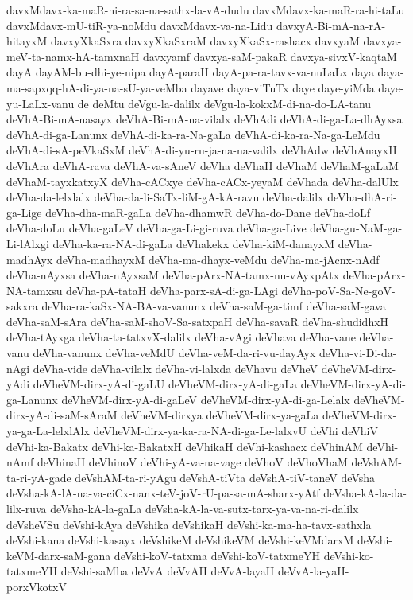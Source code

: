 {davxMdavx-ka-maR-ni-ra-sa-na-sathx-la-vA-dudu
davxMdavx-ka-maR-ra-hi-taLu
davxMdavx-mU-tiR-ya-noMdu
davxMdavx-va-na-Lidu
davxyA-Bi-mA-na-rA-hitayxM
davxyXkaSxra
davxyXkaSxraM
davxyXkaSx-rashacx
davxyaM
davxya-meV-ta-namx-hA-tamxnaH
davxyamf
davxya-saM-pakaR
davxya-sivxV-kaqtaM
dayA
dayAM-bu-dhi-ye-nipa
dayA-paraH
dayA-pa-ra-tavx-va-nuLaLx
daya
daya-ma-sapxqq-hA-di-ya-na-sU-ya-veMba
dayave
daya-viTuTx
daye
daye-yiMda
daye-yu-LaLx-vanu
de
deMtu
deVgu-la-dalilx
deVgu-la-kokxM-di-na-do-LA-tanu
deVhA-Bi-mA-nasayx
deVhA-Bi-mA-na-vilalx
deVhAdi
deVhA-di-ga-La-dhAyxsa
deVhA-di-ga-Lanunx
deVhA-di-ka-ra-Na-gaLa
deVhA-di-ka-ra-Na-ga-LeMdu
deVhA-di-sA-peVkaSxM
deVhA-di-yu-ru-ja-na-na-valilx
deVhAdw
deVhAnayxH
deVhAra
deVhA-rava
deVhA-va-sAneV
deVha
deVhaH
deVhaM
deVhaM-gaLaM
deVhaM-tayxkatxyX
deVha-cACxye
deVha-cACx-yeyaM
deVhada
deVha-dalUlx
deVha-da-lelxlalx
deVha-da-li-SaTx-liM-gA-kA-ravu
deVha-dalilx
deVha-dhA-ri-ga-Lige
deVha-dha-maR-gaLa
deVha-dhamwR
deVha-do-Dane
deVha-doLf
deVha-doLu
deVha-gaLeV
deVha-ga-Li-gi-ruva
deVha-ga-Live
deVha-gu-NaM-ga-Li-lAlxgi
deVha-ka-ra-NA-di-gaLa
deVhakekx
deVha-kiM-danayxM
deVha-madhAyx
deVha-madhayxM
deVha-ma-dhayx-veMdu
deVha-ma-jAcnx-nAdf
deVha-nAyxsa
deVha-nAyxsaM
deVha-pArx-NA-tamx-nu-vAyxpAtx
deVha-pArx-NA-tamxsu
deVha-pA-tataH
deVha-parx-sA-di-ga-LAgi
deVha-poV-Sa-Ne-goV-sakxra
deVha-ra-kaSx-NA-BA-va-vanunx
deVha-saM-ga-timf
deVha-saM-gava
deVha-saM-sAra
deVha-saM-shoV-Sa-satxpaH
deVha-savaR
deVha-shudidhxH
deVha-tAyxga
deVha-ta-tatxvX-dalilx
deVha-vAgi
deVhava
deVha-vane
deVha-vanu
deVha-vanunx
deVha-veMdU
deVha-veM-da-ri-vu-dayAyx
deVha-vi-Di-da-nAgi
deVha-vide
deVha-vilalx
deVha-vi-lalxda
deVhavu
deVheV
deVheVM-dirx-yAdi
deVheVM-dirx-yA-di-gaLU
deVheVM-dirx-yA-di-gaLa
deVheVM-dirx-yA-di-ga-Lanunx
deVheVM-dirx-yA-di-gaLeV
deVheVM-dirx-yA-di-ga-Lelalx
deVheVM-dirx-yA-di-saM-sAraM
deVheVM-dirxya
deVheVM-dirx-ya-gaLa
deVheVM-dirx-ya-ga-La-lelxlAlx
deVheVM-dirx-ya-ka-ra-NA-di-ga-Le-lalxvU
deVhi
deVhiV
deVhi-ka-Bakatx
deVhi-ka-BakatxH
deVhikaH
deVhi-kashacx
deVhinAM
deVhi-nAmf
deVhinaH
deVhinoV
deVhi-yA-va-na-vage
deVhoV
deVhoVhaM
deVshAM-ta-ri-yA-gade
deVshAM-ta-ri-yAgu
deVshA-tiVta
deVshA-tiV-taneV
deVsha
deVsha-kA-lA-na-va-ciCx-nanx-teV-joV-rU-pa-sa-mA-sharx-yAtf
deVsha-kA-la-da-lilx-ruva
deVsha-kA-la-gaLa
deVsha-kA-la-va-sutx-tarx-ya-va-na-ri-dalilx
deVsheVSu
deVshi-kAya
deVshika
deVshikaH
deVshi-ka-ma-ha-tavx-sathxla
deVshi-kana
deVshi-kasayx
deVshikeM
deVshikeVM
deVshi-keVMdarxM
deVshi-keVM-darx-saM-gana
deVshi-koV-tatxma
deVshi-koV-tatxmeYH
deVshi-ko-tatxmeYH
deVshi-saMba
deVvA
deVvAH
deVvA-layaH
deVvA-la-yaH-porxVkotxV
}

